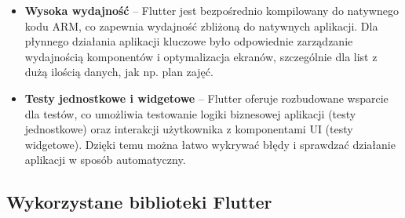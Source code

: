 \begin{itemize}
  \item \textbf{Wysoka wydajność} – Flutter jest bezpośrednio kompilowany do natywnego kodu ARM, co zapewnia wydajność zbliżoną do natywnych aplikacji. Dla płynnego działania aplikacji kluczowe było odpowiednie zarządzanie wydajnością komponentów i optymalizacja ekranów, szczególnie dla list z dużą ilością danych, jak np. plan zajęć.
  \item \textbf{Testy jednostkowe i widgetowe} – Flutter oferuje rozbudowane wsparcie dla testów, co umożliwia testowanie logiki biznesowej aplikacji (testy jednostkowe) oraz interakcji użytkownika z komponentami UI (testy widgetowe). Dzięki temu można łatwo wykrywać błędy i sprawdzać działanie aplikacji w sposób automatyczny.
\end{itemize}

\subsection{Wykorzystane biblioteki Flutter}
